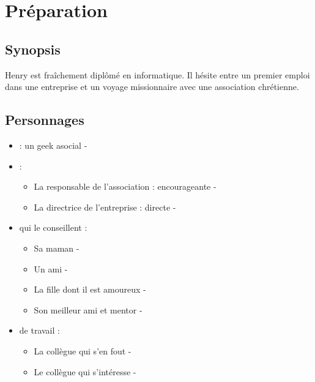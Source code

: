 \section{Préparation}

	\subsection{Synopsis}

	Henry est fraîchement diplômé en informatique.
	Il hésite entre un premier emploi dans une entreprise
	et un voyage missionnaire avec une association
	chrétienne.

	\subsection{Personnages}
	
	\begin{itemize}
	\item {} : un geek asocial - 
	\item {} : 
		\begin{itemize}
		\item La responsable de l'association : encourageante  -  
		\item La directrice de l'entreprise : directe - 
		\end{itemize}
	\item {} qui le conseillent :
		\begin{itemize}
		\item Sa maman - 
		\item Un ami - 
		\item La fille dont il est amoureux - 
		\item Son meilleur ami et mentor - 
		\end{itemize}
	\item {} de travail :
		\begin{itemize}
		\item La collègue qui s'en fout - 
		\item Le collègue qui s'intéresse - 
		\end{itemize}
	\end{itemize}
	
	
